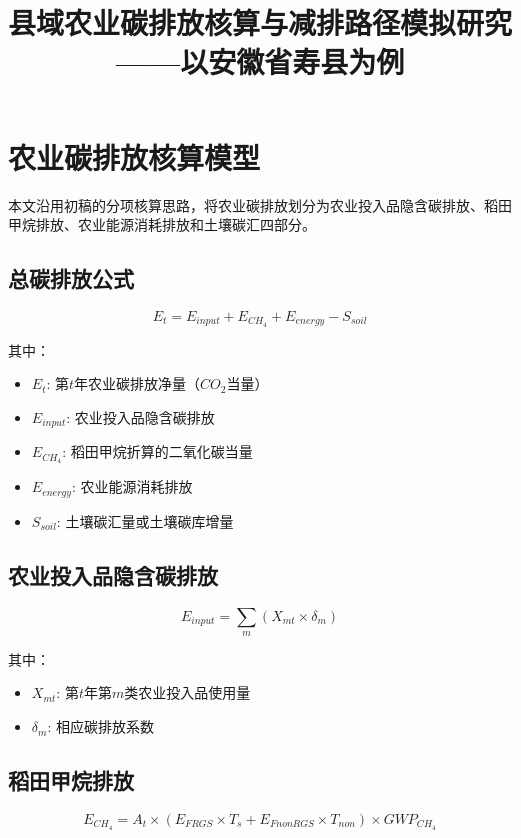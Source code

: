\documentclass{article}
\title{县域农业碳排放核算与减排路径模拟研究 \\ \small ——以安徽省寿县为例}
\author{}
\date{}
\begin{document}
\maketitle

\section{农业碳排放核算模型}

本文沿用初稿的分项核算思路，将农业碳排放划分为农业投入品隐含碳排放、稻田甲烷排放、农业能源消耗排放和土壤碳汇四部分。

\subsection{总碳排放公式}

\begin{equation}
E_t = E_{input} + E_{CH_4} + E_{energy} - S_{soil}
\end{equation}

其中：
\begin{itemize}
\item $E_t$: 第$t$年农业碳排放净量（$CO_2$当量）
\item $E_{input}$: 农业投入品隐含碳排放
\item $E_{CH_4}$: 稻田甲烷折算的二氧化碳当量
\item $E_{energy}$: 农业能源消耗排放
\item $S_{soil}$: 土壤碳汇量或土壤碳库增量
\end{itemize}

\subsection{农业投入品隐含碳排放}

\begin{equation}
E_{input} = \sum_{m} (X_{mt} \times \delta_m)
\end{equation}

其中：
\begin{itemize}
\item $X_{mt}$: 第$t$年第$m$类农业投入品使用量
\item $\delta_m$: 相应碳排放系数
\end{itemize}

\subsection{稻田甲烷排放}

\begin{equation}
E_{CH_4} = A_t \times \left( E_{FRGS} \times T_s + E_{FnonRGS} \times T_{non} \right) \times GWP_{CH_4}
\end{equation}
\end{document}
